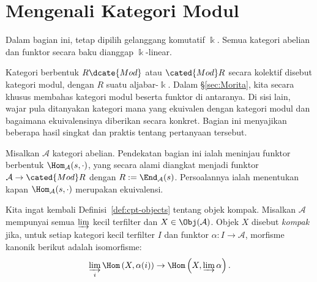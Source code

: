 
\section{Mengenali Kategori Modul}\label{sec:module-cat}
\hypertarget{o014.aljabr2.chapter7.identifying-module-categories}{ }
Dalam bagian ini, tetap dipilih gelanggang komutatif $\Bbbk$. Semua kategori
abelian dan funktor secara baku dianggap $\Bbbk$-linear.

Kategori berbentuk $R\dcate{Mod}$ atau $\cated{Mod}R$ secara kolektif disebut
kategori modul, dengan $R$ suatu aljabar-$\Bbbk$. Dalam
\S\ref{sec:Morita}, kita secara khusus membahas kategori modul beserta
funktor di antaranya. Di sisi lain, wajar pula ditanyakan kategori mana
yang ekuivalen dengan kategori modul dan bagaimana ekuivalensinya diberikan
secara konkret. Bagian ini menyajikan beberapa hasil singkat dan praktis
tentang pertanyaan tersebut.

Misalkan $\mathcal{A}$ kategori abelian. Pendekatan bagian ini ialah meninjau
funktor berbentuk $\Hom_{\mathcal{A}}(s,\mathord\cdot)$, yang secara alami
diangkat menjadi funktor $\mathcal{A}\to\cated{Mod}R$ dengan
$R:=\End_{\mathcal{A}}(s)$. Persoalannya ialah menentukan kapan
$\Hom_{\mathcal{A}}(s,\mathord\cdot)$ merupakan ekuivalensi.

Kita ingat kembali Definisi~\ref{def:cpt-objects} tentang objek kompak.
Misalkan $\mathcal{A}$ mempunyai semua $\varinjlim$ kecil terfilter dan
$X\in\Obj(\mathcal{A})$. Objek $X$ disebut \emph{kompak} jika, untuk setiap
kategori kecil terfilter $I$ dan funktor $\alpha:I\to\mathcal{A}$, morfisme
kanonik berikut adalah isomorfisme:
\[ \varinjlim_i \Hom\left( X, \alpha(i) \right) \to \Hom\left( X, \varinjlim \alpha \right). \]

